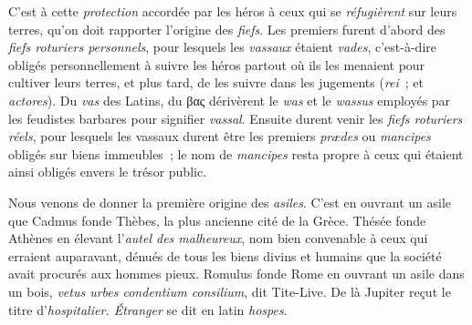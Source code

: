 \documentclass[french,twoside]{book} %
\begin{document}
 C’est à cette {\itshape protection} accordée par les héros à ceux qui se {\itshape réfugièrent} sur leurs terres, qu’on doit rapporter l’origine des {\itshape fiefs}. Les premiers furent d’abord des {\itshape fiefs roturiers personnels}, pour lesquels les {\itshape vassaux} étaient {\itshape vades}, c’est-à-dire obligés personnellement à suivre les héros partout où ils les menaient pour cultiver leurs terres, et plus tard, de les suivre dans les jugements ({\itshape rei} ; et {\itshape actores}). Du {\itshape vas} des Latins, du βας dérivèrent le {\itshape was} et le {\itshape wassus} employés par les feudistes barbares pour signifier {\itshape vassal}. Ensuite durent venir les {\itshape fiefs roturiers réels}, pour lesquels les vassaux durent être les premiers {\itshape prædes} ou {\itshape mancipes} obligés sur biens immeubles ; le nom de {\itshape mancipes} resta propre à ceux qui étaient ainsi obligés envers le trésor public.\par
\par
Nous venons de donner la première origine des {\itshape asiles}. C’est en ouvrant un asile que Cadmus fonde Thèbes, la plus ancienne cité de la Grèce. Thésée fonde Athènes en élevant l’{\itshape autel des malheureux}, nom bien convenable à ceux qui erraient auparavant, dénués de tous les biens divins et humains que la société avait procurés aux hommes pieux. Romulus fonde Rome en ouvrant un asile dans un bois, \emph{{\itshape vetus urbes condentium consilium}}, dit Tite-Live. De là Jupiter reçut le titre d’{\itshape hospitalier. Étranger} se dit en latin {\itshape hospes}.
\end{document}

